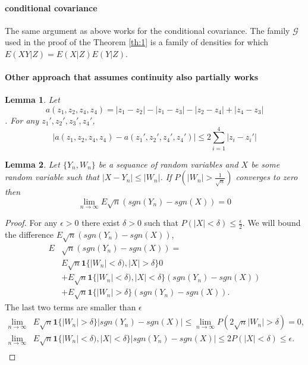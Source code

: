 \documentclass{article}
\newtheorem{lemma}{Lemma}
\begin{document}
\paragraph{conditional covariance}
The same argument as above works for the conditional covariance. The family $\mathcal G$ used in the proof of the Theorem \ref{th:1} is a family of densities for which $E(XY|Z)=E(X|Z)E(Y|Z)$. 


\paragraph{Other approach that assumes continuity also partially works}
\begin{lemma}
 Let 
 \[
  a(z_1,z_2,z_4,z_4) = |z_1-z_2| -|z_1-z_3|-|z_2-z_4|+|z_4-z_3|
 \]. 
 For any $z_1',z_2',z_3',z_4'$,
 \[
  | a(z_1,z_2,z_4,z_4) -  a(z_1',z_2',z_4',z_4')| \leq 2\sum_{i=1}^4 |z_i-z_i'|
 \]
\end{lemma}



\begin{lemma}
 Let $\{Y_n,W_n\}$ be a sequance of random variables and $X$ be some random variable such that $|X-Y_n| \leq |W_n|$. If $P(|W_n| > \frac {1}{\sqrt n} )$ converges to zero   then
 \[
  \lim_{n \to \infty } E \sqrt n (sgn(Y_n) - sgn(X)) = 0
 \]
\end{lemma} 
\begin{proof}
For any $\epsilon> 0$ there exist $\delta>0$ such that $P(|X| < \delta  ) \leq \frac \epsilon 2$. We will bound the difference $E \sqrt n (sgn(Y_n) - sgn(X))$,
\begin{align}
E & \sqrt n (sgn(Y_n) - sgn(X))= \\
& E \sqrt n \mathbf  1 \{ |W_n| < \delta ) , |X| > \delta \} 0 \\
&+ E \sqrt n \mathbf 1 \{ |W_n| < \delta)  , |X| < \delta\}  (sgn(Y_n) - sgn(X)) \\
&+ E \sqrt n \mathbf 1 \{ |W_n| > \delta  \}  (sgn(Y_n) - sgn(X)).  
 \end{align}
The last two terms are smaller than $\epsilon$
 \begin{align}
\lim_{n \to \infty}&   E\sqrt n \mathbf 1 \{ |W_n| > \delta   \}  |sgn(Y_n) - sgn(X)| \leq \lim_{n \to \infty} P(2 \sqrt n |W_n|>\delta) =0, \\
\lim_{n \to \infty}&   E \sqrt n \mathbf 1 \{ |W_n| < \delta )  , |X| < \delta  \}  |sgn(Y_n) - sgn(X)| \leq 2 P(|X| < \delta) \leq \epsilon. \\
\end{align}
\end{proof}
\end{document}
